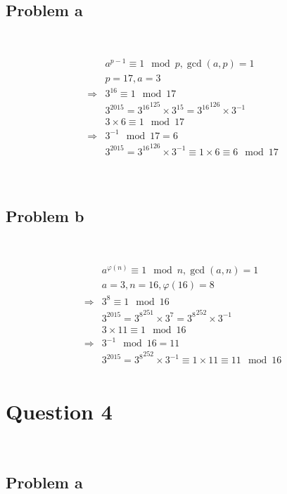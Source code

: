 \documentclass{article}
\begin{document}
~

\subsection*{Problem a }

~

\begin{align*}
    &a^{p-1}\equiv 1\mod p,\gcd(a,p)=1\\
    &p=17,a=3\\
    \Rightarrow&3^{16}\equiv 1\mod 17\\
    &3^{2015}={3^{16}}^{125}\times 3^{15}={3^{16}}^{126}\times 3^{-1}\\
    &3\times 6\equiv 1\mod 17\\
    \Rightarrow&3^{-1}\mod 17=6\\
    &3^{2015}={3^{16}}^{126}\times 3^{-1}\equiv 1\times 6\equiv 6\mod 17\\
\end{align*}

~

\subsection*{Problem b}

~

\begin{align*}
    &a^{\varphi(n)}\equiv 1\mod n,\gcd(a,n)=1\\
    &a=3,n=16,\varphi(16)=8\\
    \Rightarrow&3^8\equiv1\mod 16\\
    &3^{2015}={3^{8}}^{251}\times 3^7={3^{8}}^{252}\times 3^{-1}\\
    &3\times 11\equiv 1\mod 16\\
    \Rightarrow&3^{-1}\mod 16= 11\\
    &3^{2015}={3^{8}}^{252}\times 3^{-1}\equiv 1\times 11\equiv 11\mod 16\\
\end{align*}

\newpage

\section*{Question 4}

~

\subsection*{Problem a}
\end{document}

